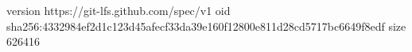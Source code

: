 version https://git-lfs.github.com/spec/v1
oid sha256:4332984ef2d1c123d45afecf33da39e160f12800e811d28cd5717bc6649f8edf
size 626416
